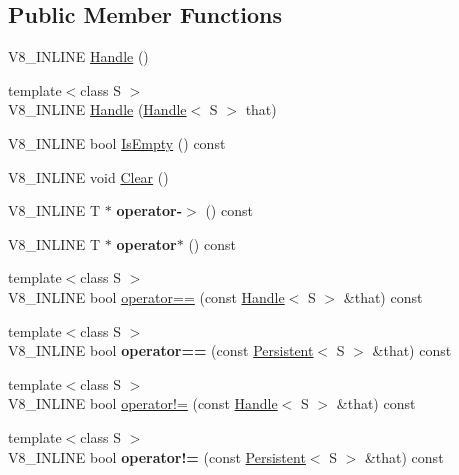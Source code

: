 \subsection*{Public Member Functions}
\begin{DoxyCompactItemize}
\item 
V8\+\_\+\+I\+N\+L\+I\+N\+E \hyperlink{classv8_1_1_handle_a38d25e9394afb08cf0aa088549dad810}{Handle} ()
\item 
{\footnotesize template$<$class S $>$ }\\V8\+\_\+\+I\+N\+L\+I\+N\+E \hyperlink{classv8_1_1_handle_a9ef27868379876db37322856edeafca7}{Handle} (\hyperlink{classv8_1_1_handle}{Handle}$<$ S $>$ that)
\item 
V8\+\_\+\+I\+N\+L\+I\+N\+E bool \hyperlink{classv8_1_1_handle_a9e58ac49e3f1a029c2c6e217a61c8419}{Is\+Empty} () const 
\item 
V8\+\_\+\+I\+N\+L\+I\+N\+E void \hyperlink{classv8_1_1_handle_a8d20b7afe6afd613b2c026c6bc863d68}{Clear} ()
\item 
\hypertarget{classv8_1_1_handle_aa0b8a411acac407a4cbacc34a8e91a93}{}V8\+\_\+\+I\+N\+L\+I\+N\+E T $\ast$ {\bfseries operator-\/$>$} () const \label{classv8_1_1_handle_aa0b8a411acac407a4cbacc34a8e91a93}

\item 
\hypertarget{classv8_1_1_handle_a6ee7868dc80307559655bd3f1c985235}{}V8\+\_\+\+I\+N\+L\+I\+N\+E T $\ast$ {\bfseries operator$\ast$} () const \label{classv8_1_1_handle_a6ee7868dc80307559655bd3f1c985235}

\item 
{\footnotesize template$<$class S $>$ }\\V8\+\_\+\+I\+N\+L\+I\+N\+E bool \hyperlink{classv8_1_1_handle_abdacd07b9678b4545e5dcf6a030ccad5}{operator==} (const \hyperlink{classv8_1_1_handle}{Handle}$<$ S $>$ \&that) const 
\item 
\hypertarget{classv8_1_1_handle_a543332fa27dcbc22cc7fe479cf946a09}{}{\footnotesize template$<$class S $>$ }\\V8\+\_\+\+I\+N\+L\+I\+N\+E bool {\bfseries operator==} (const \hyperlink{classv8_1_1_persistent}{Persistent}$<$ S $>$ \&that) const \label{classv8_1_1_handle_a543332fa27dcbc22cc7fe479cf946a09}

\item 
{\footnotesize template$<$class S $>$ }\\V8\+\_\+\+I\+N\+L\+I\+N\+E bool \hyperlink{classv8_1_1_handle_a69c7348626e4c4d9788189b4efbac2f0}{operator!=} (const \hyperlink{classv8_1_1_handle}{Handle}$<$ S $>$ \&that) const 
\item 
\hypertarget{classv8_1_1_handle_a0905039d87a40f54dbf2a015c4f6396e}{}{\footnotesize template$<$class S $>$ }\\V8\+\_\+\+I\+N\+L\+I\+N\+E bool {\bfseries operator!=} (const \hyperlink{classv8_1_1_persistent}{Persistent}$<$ S $>$ \&that) const \label{classv8_1_1_handle_a0905039d87a40f54dbf2a015c4f6396e}


\end{DoxyCompactItemize}
